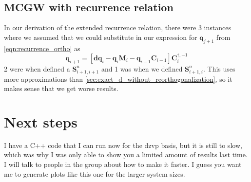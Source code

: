 \subsection{MCGW with recurrence relation}
In our derivation of the extended recurrence relation, there were 3 instances where we assumed that we could substitute in our expression for $\bm{q}_{j+1}$ from \ref{eqn:recurrence_ortho} as
\begin{equation}
    \mathbf{q}_{i+1} = \left[\mathbf{d} \mathbf{q}_i-\mathbf{q}_i \mathbf{M}_i-\mathbf{q}_{i-1} \mathbf{C}_{i-1}\right] \bm{C}_i^{\dag, -1}
\end{equation}
2 were when defined a $\bm{S}^n_{i+1, i+1}$ and 1 was when we defined $\bm{S}^n_{i+1, i}$. This uses more approximations than \ref{sec:exact_d_without_reorthogonalization}, so it makes sense that we get worse results.
\section{Next steps}
I have a C++ code that I can run now for the dzvp basis, but it is still to slow, which was why I was only able to show you a limited amount of results last time. I will talk to people in the group about how to make it faster. I guess you want me to generate plots like this one for the larger system sizes.



